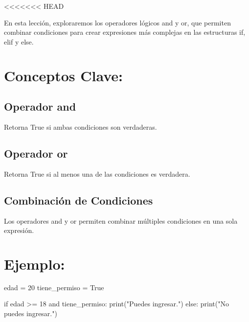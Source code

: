 \documentclass[
  a4paper,
  DIV=11,
  numbers=noendperiod,
  onepage,
  openany]{scrreprt}
\newenvironment{Shaded}{\begin{snugshade}}{\end{snugshade}}
\newcommand{\BuiltInTok}[1]{\textcolor[rgb]{0.00,0.23,0.31}{#1}}
\newcommand{\ControlFlowTok}[1]{\textcolor[rgb]{0.00,0.23,0.31}{#1}}
\newcommand{\DecValTok}[1]{\textcolor[rgb]{0.68,0.00,0.00}{#1}}
\newcommand{\KeywordTok}[1]{\textcolor[rgb]{0.00,0.23,0.31}{#1}}
\newcommand{\NormalTok}[1]{\textcolor[rgb]{0.00,0.23,0.31}{#1}}
\newcommand{\OperatorTok}[1]{\textcolor[rgb]{0.37,0.37,0.37}{#1}}
\newcommand{\StringTok}[1]{\textcolor[rgb]{0.13,0.47,0.30}{#1}}
\newcommand{\VariableTok}[1]{\textcolor[rgb]{0.07,0.07,0.07}{#1}}
\begin{document}
\textless\textless\textless\textless\textless\textless\textless{} HEAD

En esta lección, exploraremos los operadores lógicos and y or, que
permiten combinar condiciones para crear expresiones más complejas en
las estructuras if, elif y else.

\hypertarget{conceptos-clave-34}{%
\section{Conceptos Clave:}\label{conceptos-clave-34}}

\hypertarget{operador-and}{%
\subsection{Operador and}\label{operador-and}}

Retorna True si ambas condiciones son verdaderas.

\hypertarget{operador-or}{%
\subsection{Operador or}\label{operador-or}}

Retorna True si al menos una de las condiciones es verdadera.

\hypertarget{combinaciuxf3n-de-condiciones}{%
\subsection{Combinación de
Condiciones}\label{combinaciuxf3n-de-condiciones}}

Los operadores and y or permiten combinar múltiples condiciones en una
sola expresión.

\hypertarget{ejemplo-34}{%
\section{Ejemplo:}\label{ejemplo-34}}

\begin{Shaded}
\begin{Highlighting}[]
\NormalTok{edad }\OperatorTok{=} \DecValTok{20}
\NormalTok{tiene\_permiso }\OperatorTok{=} \VariableTok{True}

\ControlFlowTok{if}\NormalTok{ edad }\OperatorTok{\textgreater{}=} \DecValTok{18} \KeywordTok{and}\NormalTok{ tiene\_permiso:}
    \BuiltInTok{print}\NormalTok{(}\StringTok{"Puedes ingresar."}\NormalTok{)}
\ControlFlowTok{else}\NormalTok{:}
    \BuiltInTok{print}\NormalTok{(}\StringTok{"No puedes ingresar."}\NormalTok{)}
\end{Highlighting}
\end{Shaded}
\end{document}

